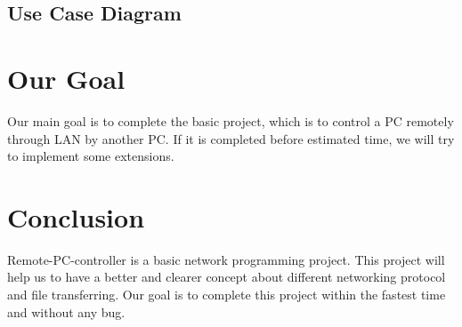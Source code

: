 \documentclass{article}
\begin{document}
\subsection{Use Case Diagram}

\section{Our Goal}
Our main goal is to complete the basic project, which is to control a PC remotely through LAN by another PC. If it is completed before estimated time, we will try to implement some extensions.


\section{Conclusion}
Remote-PC-controller is a basic network programming project. This project will help us to have a better and clearer concept about different networking protocol and file transferring. Our goal is to complete this project within the fastest time and without any bug.
\end{document}
